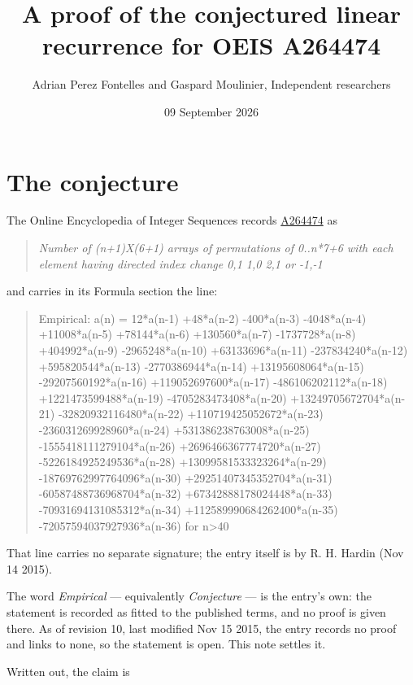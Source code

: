 \documentclass[11pt]{article}
\title{A proof of the conjectured linear recurrence for OEIS A264474}
\author{Adrian Perez Fontelles and Gaspard Moulinier, Independent researchers}
\date{09 September 2026}
\theoremstyle{definition}
\begin{document}
\maketitle
\section{The conjecture}

The Online Encyclopedia of Integer Sequences records \href{https://oeis.org/A264474}{A264474} as

\begin{quote}\itshape Number of (n+1)X(6+1) arrays of permutations of 0..n*7+6 with each element having directed index change 0,1 1,0 2,1 or -1,-1\end{quote}

and carries in its Formula section the line:

\begin{quote}\ttfamily Empirical: a(n) = 12*a(n-1) +48*a(n-2) -400*a(n-3) -4048*a(n-4) +11008*a(n-5) +78144*a(n-6) +130560*a(n-7) -1737728*a(n-8) +404992*a(n-9) -2965248*a(n-10) +63133696*a(n-11) -237834240*a(n-12) +595820544*a(n-13) -2770386944*a(n-14) +13195608064*a(n-15) -29207560192*a(n-16) +119052697600*a(n-17) -486106202112*a(n-18) +1221473599488*a(n-19) -4705283473408*a(n-20) +13249705672704*a(n-21) -32820932116480*a(n-22) +110719425052672*a(n-23) -236031269928960*a(n-24) +531386238763008*a(n-25) -1555418111279104*a(n-26) +2696466367774720*a(n-27) -5226184925249536*a(n-28) +13099581533323264*a(n-29) -18769762997764096*a(n-30) +29251407345352704*a(n-31) -60587488736968704*a(n-32) +67342888178024448*a(n-33) -70931694131085312*a(n-34) +112589990684262400*a(n-35) -72057594037927936*a(n-36) for n>40\end{quote}

That line carries no separate signature; the entry itself is by R. H. Hardin (Nov 14 2015).

The word {\itshape Empirical} --- equivalently {\itshape Conjecture} --- is the entry's own: the statement is recorded as fitted to the published terms, and no proof is given there. As of revision 10, last modified Nov 15 2015, the entry records no proof and links to none, so the statement is open. This note settles it.

Written out, the claim is
\end{document}
